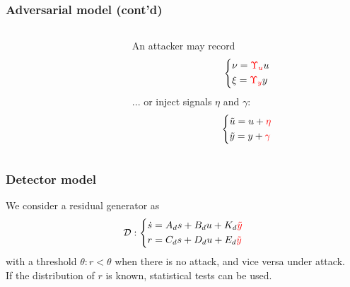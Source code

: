 \documentclass[presentation]{beamer}
\begin{document}
\begin{frame}
	\frametitle{Adversarial model (cont'd)}
	\begin{columns}
		\begin{column}{0.49\textwidth}
			\resizebox{\textwidth}{!}{}
		\end{column}
		\begin{column}{0.5\textwidth}
			An attacker may record
			\begin{align*}
				\left\lbrace
				\begin{aligned}
					&\nu = \textcolor{red}{\Upsilon_u} u \\
					&\xi = \textcolor{red}{\Upsilon_y} y
				\end{aligned}\right.
			\end{align*}
			\pause 
			... or inject signals $\eta$ and $\gamma$:
			\begin{align*}
				\left\lbrace
				\begin{aligned}
					&\tilde u = u + \color{red}{\eta} \\
					&\tilde y = y + \color{red}{\gamma}
				\end{aligned}\right.
			\end{align*}
		\end{column}
	\end{columns}
\end{frame}

\begin{frame}
	\frametitle{Detector model}
	We consider a residual generator as
	\begin{align*}
		\mathcal D: \left\lbrace
		\begin{aligned}
			&\dot s = A_d s + B_d u + K_d \color{red}\tilde y \\
			&r = C_d s + D_d u + E_d \textcolor{red}{\tilde y} 
		\end{aligned}\right. 
	\end{align*}
	with a threshold $\theta : r < \theta$ when there is no attack, and vice versa under attack.\\[1ex]
	If the distribution of $r$ is known, statistical tests can be used.
\end{frame}
\end{document}
